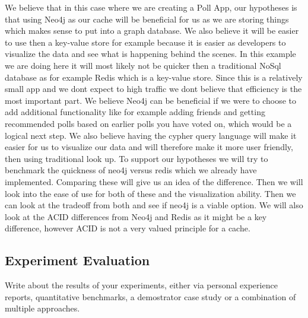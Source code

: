 We believe that in this case where we are creating a Poll App, our hypotheses is that using Neo4j as our cache will be beneficial for us as we are storing things which makes sense to put into a graph database. We also believe it will be easier to use then a key-value store for example because it is easier as developers to visualize the data and see what is happening behind the scenes. In this example we are doing here it will most likely not be quicker then a traditional NoSql database as for example Redis which is a key-value store. Since this is a relatively small app and we dont expect to high traffic we dont believe that efficiency is the most important part. We believe Neo4j can be beneficial if we were to choose to add additional functionality like for example adding friends and getting recommended polls based on earlier polls you have voted on, which would be a logical next step. We also believe having the cypher query language will make it easier for us to visualize our data and will therefore make it more user friendly, then using traditional look up. To support our hypotheses we will try to benchmark the quickness of neo4j versus redis which we already have implemented. Comparing these will give us an idea of the difference. Then we will look into the ease of use for both of these and the visualization ability. Then we can look at the tradeoff from both and see if neo4j is a viable option. We will also look at the ACID differences from Neo4j and Redis as it might be a key difference, however ACID is not a very valued principle for a cache.

\subsection{Experiment Evaluation}

Write about the results of your experiments, either via personal experience reports, quantitative benchmarks, a demostrator case study or a combination of multiple approaches.

